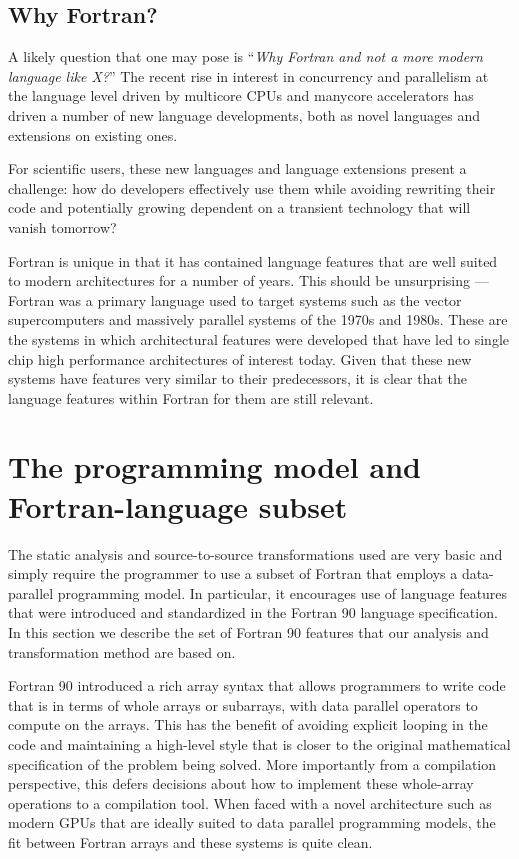 \documentclass[10pt, conference, compsocconf]{IEEEtran}
\begin{document}
\subsection{Why Fortran?}

A likely question that one may pose is ``\emph{Why Fortran and not a
  more modern language like X?}''  The recent rise in interest in
concurrency and parallelism at the language level driven by multicore
CPUs and manycore accelerators has driven a number of new language
developments, both as novel languages and extensions on existing ones.

For scientific users, these new languages and language extensions
present a challenge: how do developers effectively use them while
avoiding rewriting their code and potentially growing dependent on a
transient technology that will vanish tomorrow?

Fortran is unique in that it has contained language features that are
well suited to modern architectures for a number of years.  This
should be unsurprising --- Fortran was a primary language used to
target systems such as the vector supercomputers and massively
parallel systems of the 1970s and 1980s.  These are the systems in
which architectural features were developed that have led to single
chip high performance architectures of interest today.  Given that
these new systems have features very similar to their predecessors, it
is clear that the language features within Fortran for them are still
relevant.

\section{The programming model and Fortran-language subset}

The static analysis and source-to-source transformations used are very
basic and simply require the programmer to use a subset of Fortran
that employs a data-parallel programming model.  In particular, it
encourages use of language features that were introduced and
standardized in the Fortran 90 language specification.  In this
section we describe the set of Fortran 90 features that our analysis
and transformation method are based on.

Fortran 90 introduced a rich array syntax that allows programmers to
write code that is in terms of whole arrays or subarrays, with data
parallel operators to compute on the arrays.  This has the benefit of
avoiding explicit looping in the code and maintaining a high-level
style that is closer to the original mathematical specification of the
problem being solved.  More importantly from a compilation
perspective, this defers decisions about how to implement these
whole-array operations to a compilation tool.  When faced with a novel
architecture such as modern GPUs that are ideally suited to data parallel
programming models, the fit between Fortran arrays and these systems is
quite clean.
\end{document}
